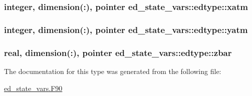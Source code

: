 \subsubsection[{\texorpdfstring{xatm}{xatm}}]{\setlength{\rightskip}{0pt plus 5cm}integer, dimension(\+:), pointer ed\+\_\+state\+\_\+vars\+::edtype\+::xatm}\hypertarget{structed__state__vars_1_1edtype_ad6b3ec02e10edccf4c9f1a14ee73880f}{}\label{structed__state__vars_1_1edtype_ad6b3ec02e10edccf4c9f1a14ee73880f}
\subsubsection[{\texorpdfstring{yatm}{yatm}}]{\setlength{\rightskip}{0pt plus 5cm}integer, dimension(\+:), pointer ed\+\_\+state\+\_\+vars\+::edtype\+::yatm}\hypertarget{structed__state__vars_1_1edtype_aea7564e821ca6d859816dbf8bda88997}{}\label{structed__state__vars_1_1edtype_aea7564e821ca6d859816dbf8bda88997}
\subsubsection[{\texorpdfstring{zbar}{zbar}}]{\setlength{\rightskip}{0pt plus 5cm}real, dimension(\+:), pointer ed\+\_\+state\+\_\+vars\+::edtype\+::zbar}\hypertarget{structed__state__vars_1_1edtype_a257929133500f55ec04685e31ddbe474}{}\label{structed__state__vars_1_1edtype_a257929133500f55ec04685e31ddbe474}


The documentation for this type was generated from the following file\+:\begin{DoxyCompactItemize}
\item 
\hyperlink{ed__state__vars_8_f90}{ed\+\_\+state\+\_\+vars.\+F90}\end{DoxyCompactItemize}
